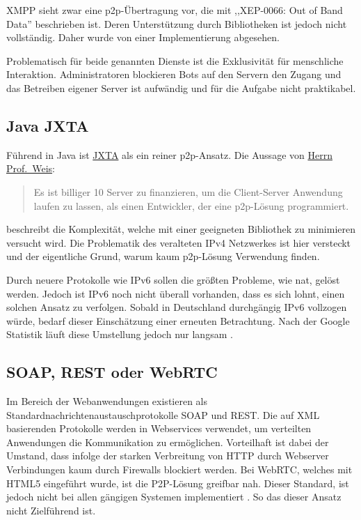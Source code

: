 \documentclass[oneside, ngerman, toc=bibliography,bibliography=totoc,listof=entryprefix, open=right,numbers=noenddot,fontsize=12pt]{scrbook}
\begin{document}
XMPP sieht zwar eine \acrshort{p2p}-Übertragung vor, die mit ,,XEP-0066: Out of Band Data''  beschrieben ist. Deren Unterstützung durch Bibliotheken ist jedoch nicht vollständig. Daher wurde von einer Implementierung abgesehen.

Problematisch für beide genannten Dienste ist die Exklusivität für menschliche Interaktion. Administratoren blockieren Bots auf den Servern den Zugang und das Betreiben eigener Server ist aufwändig und für die Aufgabe nicht praktikabel.

 
\subsection{Java JXTA}
Führend in Java ist \href{https://jxta.kenai.com/}{{JXTA}} als ein reiner \acrshort{p2p}-Ansatz. Die Aussage von \href{http://www.vs.uni-due.de/}{Herrn Prof.\ Weis}:

\begin{quote}
Es ist billiger 10 Server zu finanzieren, um die Client-Server Anwendung laufen zu lassen, als einen Entwickler, der eine \acrshort{p2p}-Lösung programmiert.
\end{quote}
beschreibt die Komplexität, welche mit einer geeigneten Bibliothek zu minimieren versucht wird.
Die Problematik des veralteten IPv4 Netzwerkes ist hier versteckt und der eigentliche Grund, warum kaum \acrshort{p2p}-Lösung Verwendung finden.

Durch neuere Protokolle wie IPv6 sollen die größten Probleme, wie \acrshort{nat}, gelöst werden.
Jedoch ist IPv6 noch nicht überall vorhanden, dass es sich lohnt, einen solchen Ansatz zu verfolgen.
Sobald in Deutschland durchgängig IPv6 vollzogen würde, bedarf dieser Einschätzung einer erneuten Betrachtung. Nach der Google Statistik läuft diese Umstellung jedoch nur langsam \cite{gstat}. 


\subsection{SOAP, REST oder WebRTC}
Im Bereich der Webanwendungen existieren als Standardnachrichtenaustauschprotokolle {SOAP} und {REST}.
Die auf {XML} basierenden Protokolle werden in Webservices verwendet, um verteilten Anwendungen die Kommunikation zu ermöglichen.
Vorteilhaft ist dabei der Umstand, dass infolge der starken Verbreitung von {HTTP} durch Webserver Verbindungen kaum durch Firewalls blockiert werden. 
Bei {WebRTC}, welches mit {HTML5} eingeführt wurde, ist die P2P-Lösung greifbar nah. Dieser Standard, ist jedoch nicht bei allen gängigen Systemen implementiert \cite{cani}. So das dieser Ansatz nicht Zielführend ist.
\end{document}
